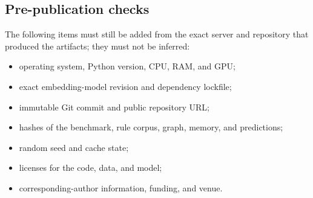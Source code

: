 \subsection{Pre-publication checks}

The following items must still be added from the exact server and repository
that produced the artifacts; they must not be inferred:

\begin{itemize}
    \item operating system, Python version, CPU, RAM, and GPU;
    \item exact embedding-model revision and dependency lockfile;
    \item immutable Git commit and public repository URL;
    \item hashes of the benchmark, rule corpus, graph, memory, and predictions;
    \item random seed and cache state;
    \item licenses for the code, data, and model;
    \item corresponding-author information, funding, and venue.
\end{itemize}

